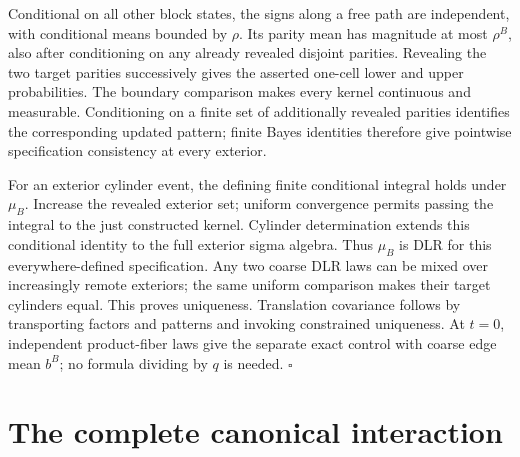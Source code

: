 Conditional on all other block states, the signs along a free path are
independent, with conditional means bounded by \(\rho\). Its parity mean
has magnitude at most \(\rho^B\), also after conditioning on any already
revealed disjoint parities. Revealing the two target parities successively
gives the asserted one-cell lower and upper probabilities. The boundary
comparison makes every kernel continuous and measurable. Conditioning on a
finite set of additionally revealed parities identifies the corresponding
updated pattern; finite Bayes identities therefore give pointwise
specification consistency at every exterior.

For an exterior cylinder event, the defining finite conditional integral
holds under \(\mu_B\). Increase the revealed exterior set; uniform
convergence permits passing the integral to the just constructed kernel.
Cylinder determination extends this conditional identity to the full
exterior sigma algebra. Thus \(\mu_B\) is DLR for this everywhere-defined
specification. Any two coarse DLR laws can be mixed over increasingly
remote exteriors; the same uniform comparison makes their target cylinders
equal. This proves uniqueness. Translation covariance follows by
transporting factors and patterns and invoking constrained uniqueness.
At \(t=0\), independent product-fiber laws give the separate exact control
with coarse edge mean \(b^B\); no formula dividing by \(q\) is needed.
\hfill\(\square\)

\section{The complete canonical interaction}
\label{sec:rg-spatial-proof-potential}

